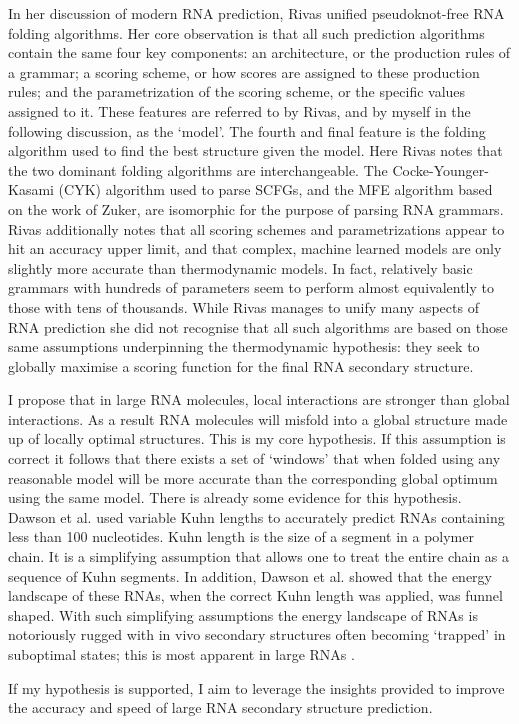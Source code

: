 \documentclass{cshonours}
\begin{document}
In her discussion of modern RNA prediction, Rivas \cite{rivas2013four} unified pseudoknot-free RNA folding algorithms. Her core observation is that all such prediction algorithms contain the same four key components: an architecture, or the production rules of a grammar; a scoring scheme, or how scores are assigned to these production rules; and the parametrization of the scoring scheme, or the specific values assigned to it. These features are referred to by Rivas, and by myself in the following discussion, as the `model'. The fourth and final feature is the folding algorithm used to find the best structure given the model. Here Rivas notes that the two dominant folding algorithms are interchangeable. The Cocke-Younger-Kasami (CYK) algorithm used to parse SCFGs, and the MFE algorithm based on the work of Zuker, are isomorphic for the purpose of parsing RNA grammars. Rivas additionally notes that all scoring schemes and parametrizations appear to hit an accuracy upper limit, and that complex, machine learned models are only slightly more accurate than thermodynamic models. In fact, relatively basic grammars with hundreds of parameters seem to perform almost equivalently to those with tens of thousands. While Rivas manages to unify many aspects of RNA prediction she did not recognise that all such algorithms are based on those same assumptions underpinning the thermodynamic hypothesis: they seek to globally maximise a scoring function for the final RNA secondary structure. 

I propose that in large RNA molecules, local interactions are stronger than global interactions. As a result RNA molecules will misfold into a global structure made up of locally optimal structures. This is my core hypothesis. If this assumption is correct it follows that there exists a set of `windows' that when folded using any reasonable model will be more accurate than the corresponding global optimum using the same model. There is already some evidence for this hypothesis. Dawson et al. \cite{dawson2013new} used variable Kuhn lengths to accurately predict RNAs containing less than 100 nucleotides. Kuhn length is the size of a segment in a polymer chain. It is a simplifying assumption that allows one to treat the entire chain as a sequence of Kuhn segments. In addition, Dawson et al. showed that the energy landscape of these RNAs, when the correct Kuhn length was applied, was funnel shaped. With such simplifying assumptions the energy landscape of RNAs is notoriously rugged with in vivo secondary structures often becoming `trapped' in suboptimal states; this is most apparent in large RNAs \cite{ditzler2008rugged}.

If my hypothesis is supported, I aim to leverage the insights provided to improve the accuracy and speed of large RNA secondary structure prediction.






\end{document}
